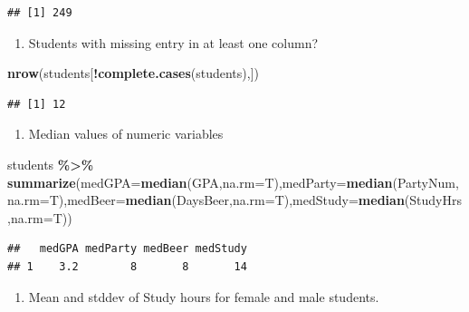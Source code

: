 \documentclass[
  openany]{book}
\newenvironment{Shaded}{\begin{snugshade}}{\end{snugshade}}
\newcommand{\AttributeTok}[1]{\textcolor[rgb]{0.13,0.29,0.53}{#1}}
\newcommand{\FunctionTok}[1]{\textcolor[rgb]{0.13,0.29,0.53}{\textbf{#1}}}
\newcommand{\NormalTok}[1]{#1}
\newcommand{\SpecialCharTok}[1]{\textcolor[rgb]{0.81,0.36,0.00}{\textbf{#1}}}
\providecommand{\tightlist}{%
  \setlength{\itemsep}{0pt}\setlength{\parskip}{0pt}}
\begin{document}
\begin{verbatim}
## [1] 249
\end{verbatim}

\begin{enumerate}
\def\labelenumi{\arabic{enumi}.}
\setcounter{enumi}{2}
\tightlist
\item
  Students with missing entry in at least one column?
\end{enumerate}

\begin{Shaded}
\begin{Highlighting}[]
\FunctionTok{nrow}\NormalTok{(students[}\SpecialCharTok{!}\FunctionTok{complete.cases}\NormalTok{(students),])}
\end{Highlighting}
\end{Shaded}

\begin{verbatim}
## [1] 12
\end{verbatim}

\begin{enumerate}
\def\labelenumi{\arabic{enumi}.}
\setcounter{enumi}{3}
\tightlist
\item
  Median values of numeric variables
\end{enumerate}

\begin{Shaded}
\begin{Highlighting}[]
\NormalTok{students }\SpecialCharTok{\%\textgreater{}\%} 
  \FunctionTok{summarize}\NormalTok{(}\AttributeTok{medGPA=}\FunctionTok{median}\NormalTok{(GPA,}\AttributeTok{na.rm=}\NormalTok{T),}\AttributeTok{medParty=}\FunctionTok{median}\NormalTok{(PartyNum,}\AttributeTok{na.rm=}\NormalTok{T),}\AttributeTok{medBeer=}\FunctionTok{median}\NormalTok{(DaysBeer,}\AttributeTok{na.rm=}\NormalTok{T),}\AttributeTok{medStudy=}\FunctionTok{median}\NormalTok{(StudyHrs,}\AttributeTok{na.rm=}\NormalTok{T))}
\end{Highlighting}
\end{Shaded}

\begin{verbatim}
##   medGPA medParty medBeer medStudy
## 1    3.2        8       8       14
\end{verbatim}

\begin{enumerate}
\def\labelenumi{\arabic{enumi}.}
\setcounter{enumi}{4}
\tightlist
\item
  Mean and stddev of Study hours for female and male students.
\end{enumerate}
\end{document}

